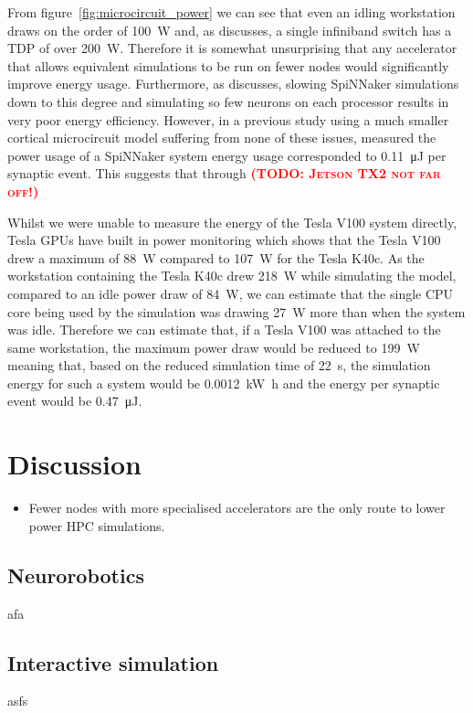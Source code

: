 \documentclass[utf8]{frontiersSCNS} %
\newcommand{\todo}[1]{\textbf{\textsc{\textcolor{red}{(TODO: #1)}}}}
\begin{document}
From figure~\ref{fig:microcircuit_power} we can see that even an idling workstation draws on the order of \SI{100}{\watt} and, as \citeauthor{VanAlbada2018} discusses, a single infiniband switch has a TDP of over \SI{200}{\watt}.
Therefore it is somewhat unsurprising that any accelerator that allows equivalent simulations to be run on fewer nodes would significantly improve energy usage.
Furthermore, as \citeauthor{VanAlbada2018} discusses, slowing SpiNNaker simulations down to this degree and simulating so few neurons on each processor results in very poor energy efficiency.
However, in a previous study using a much smaller cortical microcircuit model suffering from none of these issues, \citet{Sharp2012} measured the power usage of a SpiNNaker system energy usage corresponded to \SI{0.11}{\micro\joule} per synaptic event.
This suggests that through \todo{Jetson TX2 not far off!}

Whilst we were unable to measure the energy of the Tesla V100 system directly, Tesla GPUs have built in power monitoring which shows that the Tesla V100 drew a maximum of \SI{88}{\watt} compared to \SI{107}{\watt} for the Tesla K40c.
As the workstation containing the Tesla K40c drew \SI{218}{\watt} while simulating the model, compared to an idle power draw of \SI{84}{\watt}, we can estimate that the single CPU core being used by the simulation was drawing \SI{27}{\watt} more than when the system was idle.
Therefore we can estimate that, if a Tesla V100 was attached to the same workstation, the maximum power draw would be reduced to \SI{199}{\watt} meaning that, based on the reduced simulation time of \SI{22}{\second}, the simulation energy for such a system would be \SI{0.0012}{\kilo\watt\hour} and the energy per synaptic event would be \SI{0.47}{\micro\joule}.

\section{Discussion}
\begin{itemize}
    \item Fewer nodes with more specialised accelerators are the only route to lower power HPC simulations.
\end{itemize}

\subsection{Neurorobotics}
afa

\subsection{Interactive simulation}
asfs
\end{document}
